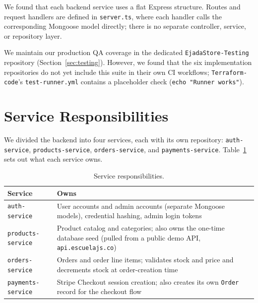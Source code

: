 We found that each backend service uses a flat Express structure. Routes and request handlers are
defined in \texttt{server.ts}, where each handler calls the corresponding Mongoose
model directly; there is no separate controller, service, or repository layer.

\begin{infobox}[Note]
We maintain our production QA coverage in the dedicated
\texttt{EjadaStore-Testing} repository (Section~\ref{sec:testing}). However, we
found that the six implementation repositories do not yet include this suite in
their own CI workflows; \texttt{Terraform-code}'s \texttt{test-runner.yml}
contains a placeholder check (\texttt{echo "Runner works"}).
\end{infobox}

\newpage
\section{Service Responsibilities}\label{sec:historical-current-background}
We divided the backend into four services, each with its own repository:
\texttt{auth-service}, \texttt{products-service}, \texttt{orders-service}, and
\texttt{payments-service}. Table~\ref{tab:domain-ownership} sets out what each
service owns.

\begin{table}[H]
\centering
\caption{Service responsibilities.}
\label{tab:domain-ownership}
\small
\begin{tabularx}{\textwidth}{>{\raggedright\arraybackslash}p{2.6cm}
                >{\raggedright\arraybackslash}X}
\toprule
\textbf{Service} & \textbf{Owns} \\
\midrule
\texttt{auth-\allowbreak service} & User accounts and admin accounts (separate Mongoose models), credential hashing, admin login tokens \\
\texttt{products-\allowbreak service} & Product catalog and categories; also owns the one-time database seed (pulled from a public demo API, \texttt{api.escuelajs.co}) \\
\texttt{orders-\allowbreak service} & Orders and order line items; validates stock and price and decrements stock at order-creation time \\
\texttt{payments-\allowbreak service} & Stripe Checkout session creation; also creates its own \texttt{Order} record for the checkout flow \\
\bottomrule
\end{tabularx}
\end{table}

